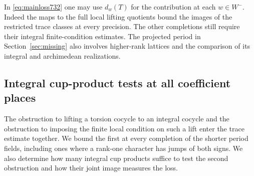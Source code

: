 \documentclass[a4paper,11pt]{article}
\theoremstyle{definition}
\theoremstyle{remark}
\numberwithin{equation}{section}
\begin{document}
In \eqref{eq:mainloss732} one may use \(d_w(T)\) for the
contribution at each \(w\in W^-\). Indeed the maps to the full
local lifting quotients bound the images of the restricted trace
classes at every precision. The other completions still require
their integral finite-condition estimates. The projected period
in Section~\ref{sec:missing} also involves higher-rank lattices
and the comparison of its integral and archimedean realizations.
\clearpage

\subsection{Integral cup-product tests at all coefficient places}
\label{sec:allcup741}

The obstruction to lifting a torsion cocycle to an integral
cocycle and the obstruction to imposing the finite local condition
on such a lift enter the trace estimate together. We bound the
first at every completion of the shorter period fields, including
ones where a rank-one character has jumps of both signs. We also
determine how many integral cup products suffice to test the
second obstruction and how their joint image measures the loss.
\end{document}
